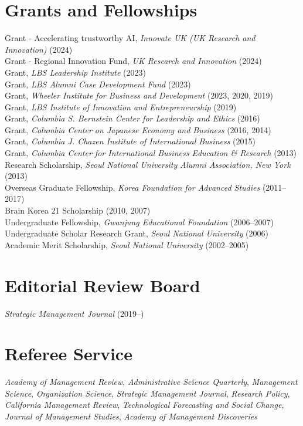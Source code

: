 \documentclass[11pt]{article}
\begin{document}
\section{Grants and Fellowships}
\vspace{3pt}
Grant - Accelerating trustworthy AI, \emph{Innovate UK (UK Research and Innovation)} (2024)\\
Grant - Regional Innovation Fund, \emph{UK Research and Innovation} (2024)\\
Grant, \emph{LBS Leadership Institute} (2023)\\
Grant, \emph{LBS Alumni Case Development Fund} (2023)\\
Grant, \emph{Wheeler Institute for Business and Development} (2023, 2020, 2019)\\
Grant, \emph{LBS Institute of Innovation and Entrepreneurship} (2019)\\
Grant, \emph{Columbia S. Bernstein Center for Leadership and Ethics} (2016)\\
Grant, \emph{Columbia Center on Japanese Economy and Business} (2016, 2014)\\
Grant, \emph{Columbia J. Chazen Institute of International Business} (2015)\\
Grant, \emph{Columbia Center for International Business Education \& Research} (2013)\\
Research Scholarship, \emph{Seoul National University Alumni Association, New York} (2013)\\
Overseas Graduate Fellowship, \emph{Korea Foundation for Advanced Studies} (2011--2017)\\
Brain Korea 21 Scholarship (2010, 2007)\\
Undergraduate Fellowship, \emph{Gwanjung Educational Foundation} (2006--2007)\\
Undergraduate Scholar Research Grant, \emph{Seoul National University} (2006)\\
Academic Merit Scholarship, \emph{Seoul National University} (2002--2005)
\section{Editorial Review Board}
\vspace{3pt}
\emph{Strategic Management Journal} (2019--)
\section{Referee Service}
\vspace{3pt}
\emph{Academy of Management Review}, \emph{Administrative Science Quarterly}, \emph{Management Science}, \emph{Organization Science}, \emph{Strategic Management Journal}, \emph{Research Policy}, \emph{California Management Review}, \emph{Technological Forecasting and Social Change}, \emph{Journal of Management Studies}, \emph{Academy of Management Discoveries}
\end{document}
